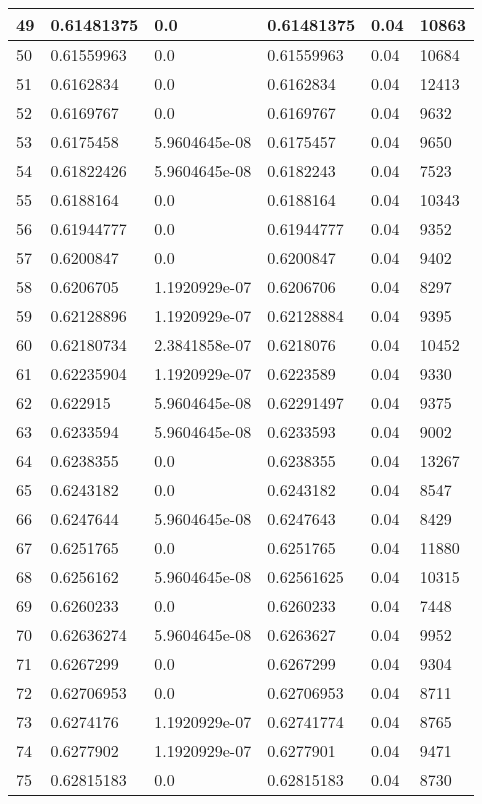\begin{longtable}{|l|l|l|l|l|l|}
49 & 0.61481375 & 0.0 & 0.61481375 & 0.04 & 10863 \\ \hline 
50 & 0.61559963 & 0.0 & 0.61559963 & 0.04 & 10684 \\ \hline 
51 & 0.6162834 & 0.0 & 0.6162834 & 0.04 & 12413 \\ \hline 
52 & 0.6169767 & 0.0 & 0.6169767 & 0.04 & 9632 \\ \hline 
53 & 0.6175458 & 5.9604645e-08 & 0.6175457 & 0.04 & 9650 \\ \hline 
54 & 0.61822426 & 5.9604645e-08 & 0.6182243 & 0.04 & 7523 \\ \hline 
55 & 0.6188164 & 0.0 & 0.6188164 & 0.04 & 10343 \\ \hline 
56 & 0.61944777 & 0.0 & 0.61944777 & 0.04 & 9352 \\ \hline 
57 & 0.6200847 & 0.0 & 0.6200847 & 0.04 & 9402 \\ \hline 
58 & 0.6206705 & 1.1920929e-07 & 0.6206706 & 0.04 & 8297 \\ \hline 
59 & 0.62128896 & 1.1920929e-07 & 0.62128884 & 0.04 & 9395 \\ \hline 
60 & 0.62180734 & 2.3841858e-07 & 0.6218076 & 0.04 & 10452 \\ \hline 
61 & 0.62235904 & 1.1920929e-07 & 0.6223589 & 0.04 & 9330 \\ \hline 
62 & 0.622915 & 5.9604645e-08 & 0.62291497 & 0.04 & 9375 \\ \hline 
63 & 0.6233594 & 5.9604645e-08 & 0.6233593 & 0.04 & 9002 \\ \hline 
64 & 0.6238355 & 0.0 & 0.6238355 & 0.04 & 13267 \\ \hline 
65 & 0.6243182 & 0.0 & 0.6243182 & 0.04 & 8547 \\ \hline 
66 & 0.6247644 & 5.9604645e-08 & 0.6247643 & 0.04 & 8429 \\ \hline 
67 & 0.6251765 & 0.0 & 0.6251765 & 0.04 & 11880 \\ \hline 
68 & 0.6256162 & 5.9604645e-08 & 0.62561625 & 0.04 & 10315 \\ \hline 
69 & 0.6260233 & 0.0 & 0.6260233 & 0.04 & 7448 \\ \hline 
70 & 0.62636274 & 5.9604645e-08 & 0.6263627 & 0.04 & 9952 \\ \hline 
71 & 0.6267299 & 0.0 & 0.6267299 & 0.04 & 9304 \\ \hline 
72 & 0.62706953 & 0.0 & 0.62706953 & 0.04 & 8711 \\ \hline 
73 & 0.6274176 & 1.1920929e-07 & 0.62741774 & 0.04 & 8765 \\ \hline 
74 & 0.6277902 & 1.1920929e-07 & 0.6277901 & 0.04 & 9471 \\ \hline 
75 & 0.62815183 & 0.0 & 0.62815183 & 0.04 & 8730 \\ \hline 
\end{longtable}